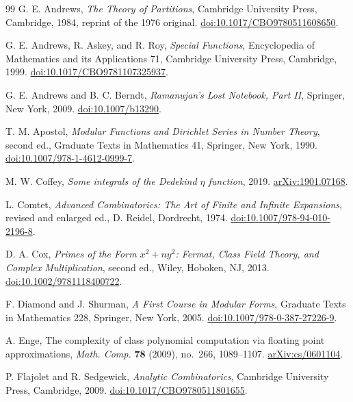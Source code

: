\documentclass[11pt]{amsart}
\theoremstyle{definition}
\theoremstyle{remark}
\numberwithin{equation}{section}
\begin{document}
\begin{thebibliography}{99}
G. E. Andrews, \emph{The Theory of Partitions}, Cambridge University Press, Cambridge, 1984, reprint of the 1976 original.
\href{https://doi.org/10.1017/CBO9780511608650}{doi:10.1017/CBO9780511608650}.

G. E. Andrews, R. Askey, and R. Roy, \emph{Special Functions}, Encyclopedia of Mathematics and its Applications 71, Cambridge University Press, Cambridge, 1999.
\href{https://doi.org/10.1017/CBO9781107325937}{doi:10.1017/CBO9781107325937}.

G. E. Andrews and B. C. Berndt, \emph{Ramanujan's Lost Notebook, Part II}, Springer, New York, 2009.
\href{https://doi.org/10.1007/b13290}{doi:10.1007/b13290}.

T. M. Apostol, \emph{Modular Functions and Dirichlet Series in Number Theory}, second ed., Graduate Texts in Mathematics 41, Springer, New York, 1990.
\href{https://doi.org/10.1007/978-1-4612-0999-7}{doi:10.1007/978-1-4612-0999-7}.

M. W. Coffey, \emph{Some integrals of the Dedekind $\eta$ function}, 2019.
\href{https://arxiv.org/abs/1901.07168}{arXiv:1901.07168}.

L. Comtet, \emph{Advanced Combinatorics: The Art of Finite and Infinite Expansions}, revised and enlarged ed., D. Reidel, Dordrecht, 1974.
\href{https://doi.org/10.1007/978-94-010-2196-8}{doi:10.1007/978-94-010-2196-8}.

D. A. Cox, \emph{Primes of the Form $x^2+ny^2$: Fermat, Class Field Theory, and Complex Multiplication}, second ed., Wiley, Hoboken, NJ, 2013.
\href{https://doi.org/10.1002/9781118400722}{doi:10.1002/9781118400722}.

F. Diamond and J. Shurman, \emph{A First Course in Modular Forms}, Graduate Texts in Mathematics 228, Springer, New York, 2005.
\href{https://doi.org/10.1007/978-0-387-27226-9}{doi:10.1007/978-0-387-27226-9}.

A. Enge, The complexity of class polynomial computation via floating point approximations, \emph{Math. Comp.} \textbf{78} (2009), no.~266, 1089--1107.
\href{https://arxiv.org/abs/cs/0601104}{arXiv:cs/0601104}.

P. Flajolet and R. Sedgewick, \emph{Analytic Combinatorics}, Cambridge University Press, Cambridge, 2009.
\href{https://doi.org/10.1017/CBO9780511801655}{doi:10.1017/CBO9780511801655}.


\end{thebibliography}
\end{document}
